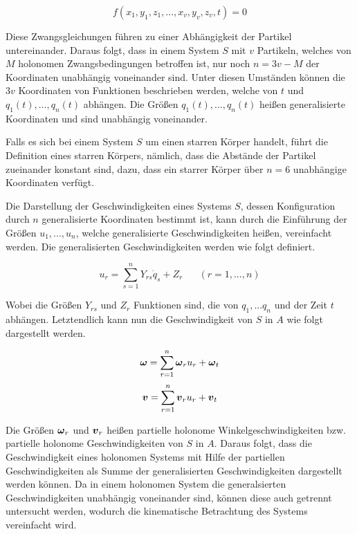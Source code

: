 \begin{equation}
f(x_1, y_1, z_1,...,x_v, y_v, z_v,t) = 0
\end{equation}

Diese Zwangsgleichungen führen zu einer Abhängigkeit der Partikel untereinander. Daraus folgt, dass in einem System $S$ mit $v$ Partikeln, welches von $M$ holonomen Zwangsbedingungen betroffen ist, nur noch $n = 3v - M$ der Koordinaten unabhängig voneinander sind. Unter diesen Umständen können die $3v$ Koordinaten von Funktionen beschrieben werden, welche von $t$ und $q_1(t),...,q_n(t)$ abhängen. Die Größen $q_1(t),...,q_n(t)$ heißen generalisierte Koordinaten und sind unabhängig voneinander. 

Falls es sich bei einem System $S$ um einen starren Körper handelt, führt die Definition eines starren Körpers, nämlich, dass die Abstände der Partikel zueinander konstant sind, dazu, dass ein starrer Körper über $n=6$ unabhängige Koordinaten verfügt.

Die Darstellung der Geschwindigkeiten eines Systems $S$, dessen Konfiguration durch $n$ generalisierte Koordinaten bestimmt ist, kann durch die Einführung der Größen $u_1,...,u_n$, welche generalisierte Geschwindigkeiten heißen, vereinfacht werden. Die generalisierten Geschwindigkeiten werden wie folgt definiert.

\begin{equation}
u_r = \sum^n_{s=1} Y_{rs}\dot{q}_s + Z_r \hspace{20pt} (r=1,...,n)
\end{equation}

Wobei die Größen $Y_{rs}$ und $Z_r$ Funktionen sind, die von $q_1,...q_n$ und der Zeit $t$ abhängen. Letztendlich kann nun die Geschwindigkeit von $S$ in $A$ wie folgt dargestellt werden.

\begin{equation}
\boldsymbol{\omega} = \sum^n_{r=1} \boldsymbol{\omega}_r u_r + \boldsymbol{\omega}_t
\end{equation}
\begin{equation}
\boldsymbol{v} = \sum^n_{r=1} \boldsymbol{v}_r u_r + \boldsymbol{v}_t
\end{equation}

Die Größen $\boldsymbol{\omega}_r$ und $\boldsymbol{v}_r$ heißen partielle holonome Winkelgeschwindigkeiten bzw. partielle holonome Geschwindigkeiten von $S$ in $A$. Daraus folgt, dass die Geschwindigkeit eines holonomen Systems mit Hilfe der partiellen Geschwindigkeiten als Summe der generalisierten Geschwindigkeiten dargestellt werden können. Da in einem holonomen System die generalsierten Geschwindigkeiten unabhängig voneinander sind, können diese auch getrennt untersucht werden, wodurch die kinematische Betrachtung des Systems vereinfacht wird.

